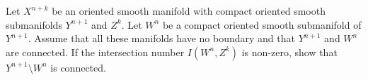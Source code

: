Let $X^{n+k}$ be an oriented smooth manifold with compact oriented
smooth submanifolds $Y^{n+1}$ and $Z^k$. Let $W^n$ be a compact
oriented smooth submanifold of $Y^{n+1}$. Assume that all these
manifolds have no boundary and that $Y^{n+1}$ and $W^n$ are
connected. If the intersection number $I(W^n,Z^k)$ is non-zero, show
that $Y^{n+1}\setminus W^n$ is connected.
